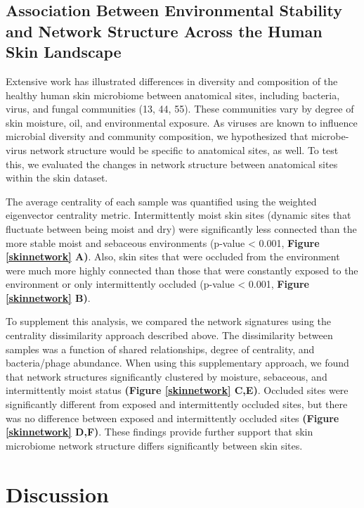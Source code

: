 \documentclass[12pt,]{article}
\begin{document}
\subsection{Association Between Environmental Stability and Network
Structure Across the Human Skin
Landscape}\label{association-between-environmental-stability-and-network-structure-across-the-human-skin-landscape}

Extensive work has illustrated differences in diversity and composition
of the healthy human skin microbiome between anatomical sites, including
bacteria, virus, and fungal communities (13, 44, 55). These communities
vary by degree of skin moisture, oil, and environmental exposure. As
viruses are known to influence microbial diversity and community
composition, we hypothesized that microbe-virus network structure would
be specific to anatomical sites, as well. To test this, we evaluated the
changes in network structure between anatomical sites within the skin
dataset.

The average centrality of each sample was quantified using the weighted
eigenvector centrality metric. Intermittently moist skin sites (dynamic
sites that fluctuate between being moist and dry) were significantly
less connected than the more stable moist and sebaceous environments
(p-value \textless{} 0.001, \textbf{Figure \ref{skinnetwork} A)}. Also,
skin sites that were occluded from the environment were much more highly
connected than those that were constantly exposed to the environment or
only intermittently occluded (p-value \textless{} 0.001, \textbf{Figure
\ref{skinnetwork} B)}.

To supplement this analysis, we compared the network signatures using
the centrality dissimilarity approach described above. The dissimilarity
between samples was a function of shared relationships, degree of
centrality, and bacteria/phage abundance. When using this supplementary
approach, we found that network structures significantly clustered by
moisture, sebaceous, and intermittently moist status \textbf{(Figure
\ref{skinnetwork} C,E)}. Occluded sites were significantly different
from exposed and intermittently occluded sites, but there was no
difference between exposed and intermittently occluded sites
\textbf{(Figure \ref{skinnetwork} D,F)}. These findings provide further
support that skin microbiome network structure differs significantly
between skin sites.

\section{Discussion}\label{discussion}
\end{document}

